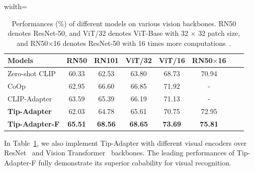 \documentclass[10pt,twocolumn,letterpaper]{article}
\begin{document}
\begin{table}[t!]
\centering
\vspace*{13pt}
\begin{adjustbox}{width=\linewidth}
	\begin{tabular}{lccccccc}
	\toprule
		Models & RN50 & RN101 &  ViT/32 & ViT/16 & RN50$\times$16\\ \midrule
		Zero-shot CLIP\cite{radford2021learning} &60.33 &62.53 &63.80 &68.73 &70.94\\
		CoOp\cite{zhou2021coop} & 62.95 &66.60 & 66.85  &71.92 &-\\
		CLIP-Adapter\cite{gao2021clip} & 63.59 & 65.39 & 66.19 &71.13 &-\\
		\textbf{Tip-Adapter} & 62.03 & 64.78 & 65.61 & 70.75 &72.95\\
	    \textbf{Tip-Adapter-F} & \textbf{65.51} & \textbf{68.56} & \textbf{68.65} & \textbf{73.69} &\textbf{75.81}\\
	\bottomrule
	\end{tabular}
\end{adjustbox}
\caption{Performances ($\%$) of different models on various vision backbones. RN50 denotes ResNet-50, and ViT/32 denotes ViT-Base with 32 $\times$ 32 patch size, and RN50$\times$16 denotes ResNet-50 with 16 times more computations~\cite{radford2021learning}. }
\vspace*{-12pt}
\label{backbone}
\end{table}

In Table~\ref{backbone}, we also implement Tip-Adapter with different visual encoders over ResNet~\cite{he2016deep} and Vision Transformer~\cite{dosovitskiy2021vit} backbones. The leading performances of Tip-Adapter-F fully demonstrate its superior cabability for visual recognition.

\end{document}
